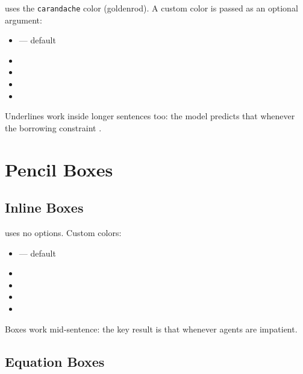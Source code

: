 \documentclass[11pt,a4paper]{article}
\begin{document}
 uses the \texttt{carandache} color (goldenrod). A custom color is passed as an optional argument:

\begin{itemize}
    \item {} — default
    \item {}
    \item {}
    \item {}
    \item {}
\end{itemize}

Underlines work inside longer sentences too: the model predicts that  whenever the borrowing constraint .

\section{Pencil Boxes}

\subsection{Inline Boxes}

 uses no options. Custom colors:

\begin{itemize}
    \item {} — default
    \item {}
    \item {}
    \item {}
    \item {}
\end{itemize}

Boxes work mid-sentence: the key result is that  whenever agents are impatient.

\subsection{Equation Boxes}
\end{document}

